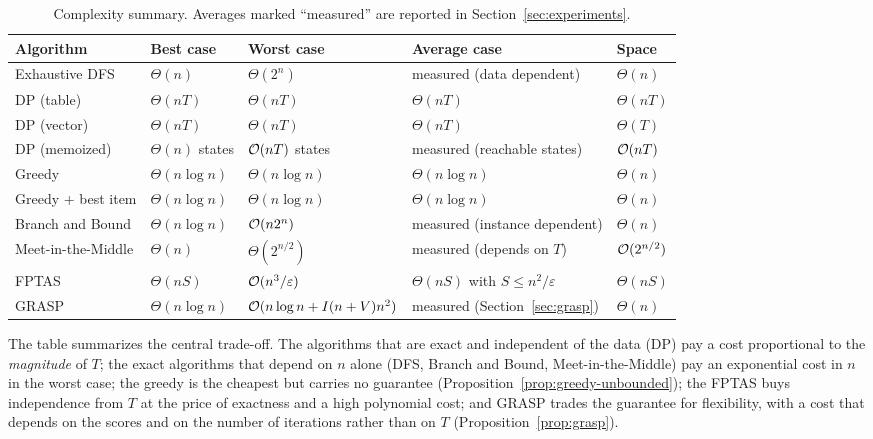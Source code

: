 \begin{table}[h]
\centering
\caption{Complexity summary. Averages marked ``measured'' are reported in Section~\ref{sec:experiments}.}\label{tab:complexity}
\small
\begin{tabularx}{\linewidth}{@{}l l l X l@{}}
\toprule
Algorithm & Best case & Worst case & Average case & Space\\
\midrule
Exhaustive DFS & $\Theta(n)$ & $\Theta(2^n)$ & measured (data dependent) & $\Theta(n)$\\
DP (table) & $\Theta(nT)$ & $\Theta(nT)$ & $\Theta(nT)$ & $\Theta(nT)$\\
DP (vector) & $\Theta(nT)$ & $\Theta(nT)$ & $\Theta(nT)$ & $\Theta(T)$\\
DP (memoized) & $\Theta(n)$ states & $\mathcal{O}(nT)$ states & measured (reachable states) & $\mathcal{O}(nT)$\\
Greedy & $\Theta(n\log n)$ & $\Theta(n\log n)$ & $\Theta(n\log n)$ & $\Theta(n)$\\
Greedy + best item & $\Theta(n\log n)$ & $\Theta(n\log n)$ & $\Theta(n\log n)$ & $\Theta(n)$\\
Branch and Bound & $\Theta(n\log n)$ & $\mathcal{O}(n2^n)$ & measured (instance dependent) & $\Theta(n)$\\
Meet-in-the-Middle & $\Theta(n)$ & $\Theta(2^{n/2})$ & measured (depends on $T$) & $\mathcal{O}(2^{n/2})$\\
FPTAS & $\Theta(nS)$ & $\mathcal{O}(n^3/\varepsilon)$ & $\Theta(nS)$ with $S\le n^2/\varepsilon$ & $\Theta(nS)$\\
GRASP & $\Theta(n\log n)$ & $\mathcal{O}(n\log n+I(n+V)n^2)$ & measured (Section~\ref{sec:grasp}) & $\Theta(n)$\\
\bottomrule
\end{tabularx}
\end{table}

The table summarizes the central trade-off. The algorithms that are exact and independent of the data (DP) pay a cost proportional to the \emph{magnitude} of $T$; the exact algorithms that depend on $n$ alone (DFS, Branch and Bound, Meet-in-the-Middle) pay an exponential cost in $n$ in the worst case; the greedy is the cheapest but carries no guarantee (Proposition~\ref{prop:greedy-unbounded}); the FPTAS buys independence from $T$ at the price of exactness and a high polynomial cost; and GRASP trades the guarantee for flexibility, with a cost that depends on the scores and on the number of iterations rather than on $T$ (Proposition~\ref{prop:grasp}).
